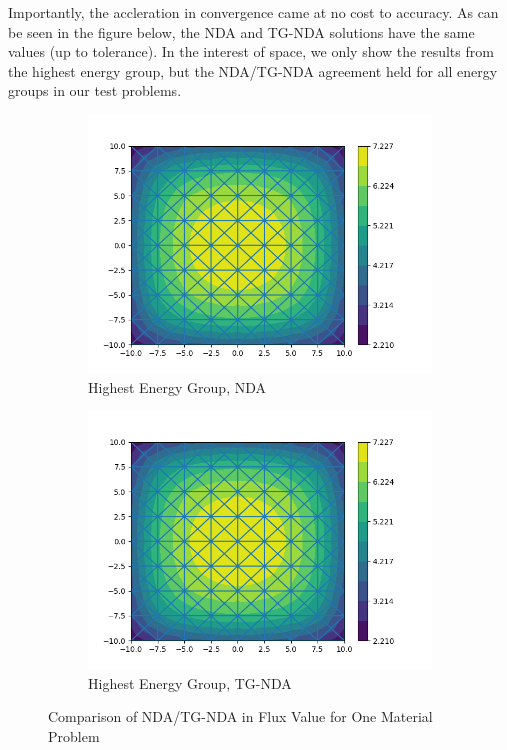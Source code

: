 Importantly, the accleration in convergence came at no cost to accuracy. As can be seen in the figure below, the NDA and TG-NDA solutions have the same values (up to tolerance). In the interest of space, we only show the results from the highest energy group, but the NDA/TG-NDA agreement held for all energy groups in our test problems. 
\begin{figure}[H]
\centering
\begin{subfigure}{.5\textwidth}
  \centering
  \includegraphics[width=\linewidth]{fig/nda_c5g7mod_scalar_flux_group0.png}
  \caption{Highest Energy Group, NDA}
  \label{fig:NDA-Mod}
\end{subfigure}%
\begin{subfigure}{.5\textwidth}
  \centering
  \includegraphics[width=\linewidth]{fig/tgnda_c5g7mod_scalar_flux_group0.png}
  \caption{Highest Energy Group, TG-NDA}
  \label{fig:TG-NDA-Mod}
\end{subfigure}
\caption{Comparison of NDA/TG-NDA in Flux Value for One Material Problem}
\label{fig:Moderator}
\end{figure}
